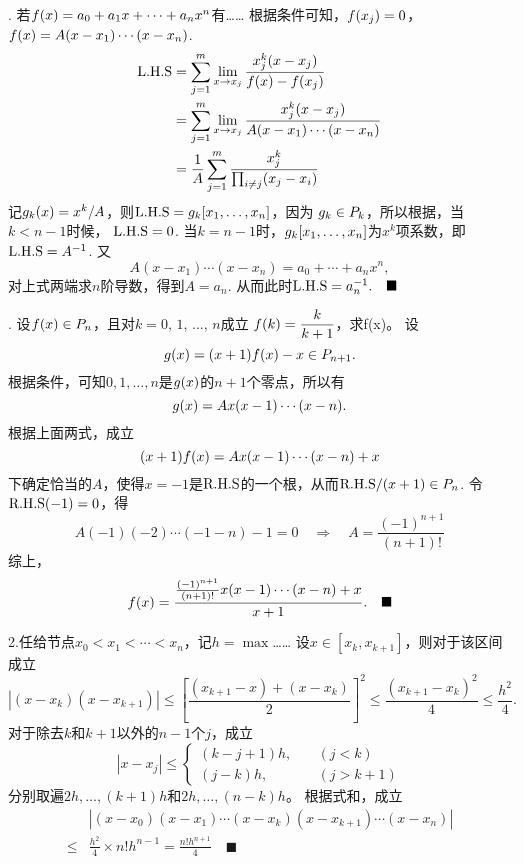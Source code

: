 \vspace{1cm}
\par{}. 若$\mathnormal{f}(x) = a_0 + a_1x + \cdots + a_nx^n$有……
\ans
  根据条件可知，$\mathnormal{f}(x_j) = 0$，$\mathnormal{f}(x) = A(x-x_1)\cdots(x-x_n)$.
  \[\begin{split}
   \text{L.H.S} &= \sum_{j=1}^m\lim_{x\to x_j} \frac{x_j^k(x-x_j)}{\mathnormal{f}(x)-\mathnormal{f}(x_j)} \\
   &= \sum_{j=1}^m\lim_{x\to x_j}\frac{x_j^k(x-x_j)}{A(x-x_1)\cdots(x-x_n)} \\
   &= \frac{1}{A}\sum_{j=1}^m\frac{x_j^k}{\prod_{i\ne j}(x_j-x_i)}
  \end{split}\]
  记$\mathnormal{g}_k(x) = x^k/A$，则$\text{L.H.S} = \mathnormal{g}_k[x_1,\dots,x_n]$，因为
  $\mathnormal{g}_k\in P_k$，所以根据，当$k<n-1$时候，
  $\text{L.H.S} = 0$. 当$k=n-1$时，$\mathnormal{g}_k[x_1,\dots,x_n]$为$x^k$项系数，即$\text{L.H.S}=A^{-1}$.
  又
  \[
    A(x-x_1)\cdots(x-x_n) = a_0 + \cdots + a_nx^n,
  \]
  对上式两端求$n$阶导数，得到$A = a_n$. 从而此时$\text{L.H.S}=a_n^{-1}.\quad\blacksquare$

\vspace{1cm}
\par{}. 设$\mathnormal{f}(x)\in P_n$，且对$k = 0,\,1,\,\dots,\,n$成立
  $\mathnormal{f}(k) = \dfrac{k}{k+1}$，求f(x)。
\ans
  设
  \[
    \mathnormal{g}(x) = (x+1)\mathnormal{f}(x) - x\in P_{n+1}.
  \]
  根据条件，可知$0,1,\dots,n$是$\mathnormal{g}(x)$的$n+1$个零点，所以有
  \[
    \mathnormal{g}(x) = Ax(x-1)\cdots(x-n).
  \]
  根据上面两式，成立
  \[
    (x+1)\mathnormal{f}(x) = Ax(x-1)\cdots(x-n) + x
  \]
  下确定恰当的$A$，使得$x=-1$是$\text{R.H.S}$的一个根，从而$\text{R.H.S}/(x+1)\in P_n$.
  令$\text{R.H.S}(-1)=0$，得
  \[
    A(-1)(-2)\cdots(-1-n) - 1 = 0 \quad\Rightarrow\quad
    A = \frac{(-1)^{n+1}}{(n+1)!}
  \]
  综上，
  \[
    \mathnormal{f}(x) = \frac{\frac{(-1)^{n+1}}{(n+1)!}x(x-1)\cdots(x-n)+x}{x+1}.
    \quad\blacksquare
  \]

\vspace{1cm}
\noindent2.任给节点$x_0 < x_1 <\cdots< x_n$，记$h = \max$……
\ans
  设$x\in[x_k, x_{k+1}]$，则对于该区间成立
  \begin{equation}
    \label{equ: x_k}
    |(x-x_k)(x-x_{k+1})| \le \left[\frac{(x_{k+1}-x) + (x-x_k)}{2}\right]^2
    \le \frac{(x_{k+1}-x_k)^2}{4} \le \frac{h^2}{4}.
  \end{equation}
  对于除去$k$和$k+1$以外的$n-1$个$j$，成立
  \begin{equation}
    \label{equ: x_j}
    |x-x_j| \le
    \begin{cases}
      (k-j+1)h,&\quad(j<k)\\
      (j-k)h,&\quad(j>k+1)
    \end{cases}
  \end{equation}
  分别取遍$2h,\dots,(k+1)h$和$2h,\dots,(n-k)h$。
  根据式和，成立
  \[\begin{split}
    & |(x-x_0)(x-x_1)\cdots(x-x_k)(x-x_{k+1})\cdots(x-x_n)| \\
    \le& \frac{h^2}{4}\times n!h^{n-1} = \frac{n!h^{n+1}}{4}
    \quad\blacksquare
  \end{split}\]



